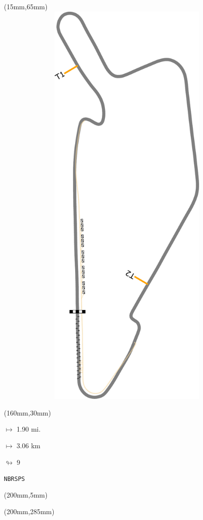\begin{textblock*}{185mm}(15mm,65mm)%
\centering
\mbox{\includegraphics[width=185mm,height=210mm,keepaspectratio]{PT/NBRSPS.pdf}}
\end{textblock*}
\begin{textblock*}{40mm}(160mm,30mm)%
\Large
\par$\mapsto$ 1.90 mi.
\par$\mapsto$ 3.06 km
\par$\looparrowright$ 9
\par\hfill\tiny\tt NBRSPS\\
\end{textblock*}
\begin{textblock*}{20mm}(200mm,5mm)%
\fbox{\thepage}
\label{NBRSPS}
\end{textblock*}
\begin{textblock*}{20mm}(200mm,285mm)%
\fbox{\thepage}
\end{textblock*}

